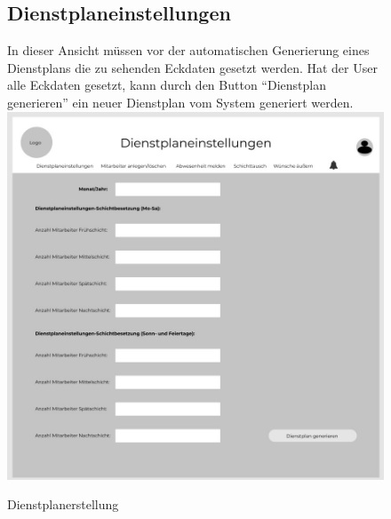 \documentclass[11pt,
paper=a4,
bibtotocnumbered,	  %
liststotocnumbered,  %
DIV=calc,		  %
tablecaptionabove,	  %
headinclude,
]{article}
\begin{document}
\begin{figure}[H]
\subsection{Dienstplaneinstellungen}
In dieser Ansicht müssen vor der automatischen Generierung eines Dienstplans die zu sehenden Eckdaten gesetzt werden. Hat der User alle Eckdaten gesetzt, kann durch den Button “Dienstplan generieren” ein neuer Dienstplan vom System generiert werden.
\includegraphics[scale=1]{Bilder/Dienstplanerstellung.jpg}
\caption{Dienstplanerstellung}
\end{figure}
\end{document}
